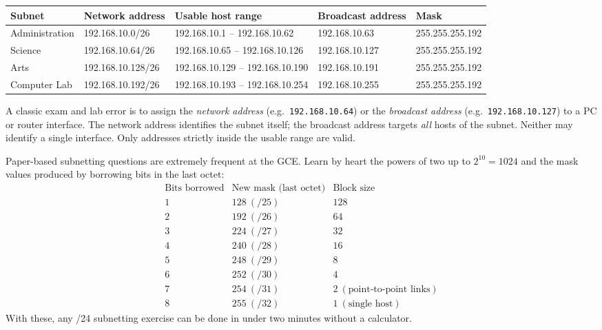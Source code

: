 \documentclass[11pt]{article}
\begin{document}
\begin{center}
\begin{tabularx}{\linewidth}{|l|X|X|X|X|}
\hline
\rowcolor{popblueL} \textbf{Subnet} & \textbf{Network address} & \textbf{Usable host range} & \textbf{Broadcast address} & \textbf{Mask} \\
\hline
Administration & 192.168.10.0/26 & 192.168.10.1 -- 192.168.10.62 & 192.168.10.63 & 255.255.255.192 \\
Science & 192.168.10.64/26 & 192.168.10.65 -- 192.168.10.126 & 192.168.10.127 & 255.255.255.192 \\
Arts & 192.168.10.128/26 & 192.168.10.129 -- 192.168.10.190 & 192.168.10.191 & 255.255.255.192 \\
Computer Lab & 192.168.10.192/26 & 192.168.10.193 -- 192.168.10.254 & 192.168.10.255 & 255.255.255.192 \\
\hline
\end{tabularx}
\end{center}

\begin{attention}
A classic exam and lab error is to assign the \emph{network address} (e.g.\ \texttt{192.168.10.64}) or the \emph{broadcast address} (e.g.\ \texttt{192.168.10.127}) to a PC or router interface. The network address identifies the subnet itself; the broadcast address targets \emph{all} hosts of the subnet. Neither may identify a single interface. Only addresses strictly inside the usable range are valid.
\end{attention}

\begin{aretenir}
Paper-based subnetting questions are extremely frequent at the GCE. Learn by heart the powers of two up to $2^{10} = 1024$ and the mask values produced by borrowing bits in the last octet:
\[
\begin{array}{c|c|c}
\text{Bits borrowed} & \text{New mask (last octet)} & \text{Block size} \\ \hline
1 & 128\ ( /25) & 128 \\
2 & 192\ ( /26) & 64 \\
3 & 224\ ( /27) & 32 \\
4 & 240\ ( /28) & 16 \\
5 & 248\ ( /29) & 8 \\
6 & 252\ ( /30) & 4 \\
7 & 254\ ( /31) & 2\ (\text{point-to-point links}) \\
8 & 255\ ( /32) & 1\ (\text{single host})
\end{array}
\]
With these, any /24 subnetting exercise can be done in under two minutes without a calculator.
\end{aretenir}
\end{document}
